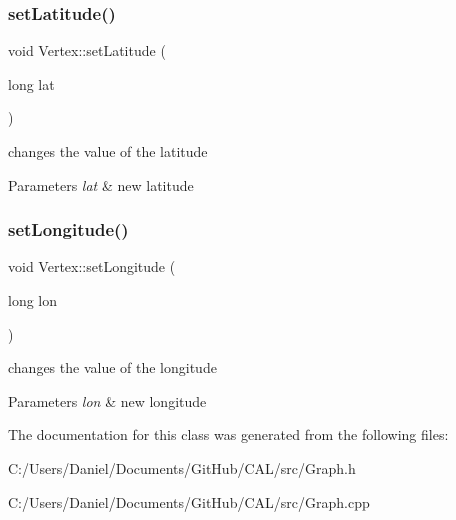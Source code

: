 \subsubsection{\texorpdfstring{set\+Latitude()}{setLatitude()}}
{\footnotesize\ttfamily void Vertex\+::set\+Latitude (\begin{DoxyParamCaption}\item[{long}]{lat }\end{DoxyParamCaption})}



changes the value of the latitude 


\begin{DoxyParams}{Parameters}
{\em lat} & new latitude \\
\hline
\end{DoxyParams}
\hypertarget{class_vertex_a7d0a5b733d2989ff210731130d59ea01}{}\label{class_vertex_a7d0a5b733d2989ff210731130d59ea01} 
\subsubsection{\texorpdfstring{set\+Longitude()}{setLongitude()}}
{\footnotesize\ttfamily void Vertex\+::set\+Longitude (\begin{DoxyParamCaption}\item[{long}]{lon }\end{DoxyParamCaption})}



changes the value of the longitude 


\begin{DoxyParams}{Parameters}
{\em lon} & new longitude \\
\hline
\end{DoxyParams}


The documentation for this class was generated from the following files\+:\begin{DoxyCompactItemize}
\item 
C\+:/\+Users/\+Daniel/\+Documents/\+Git\+Hub/\+C\+A\+L/src/Graph.\+h\item 
C\+:/\+Users/\+Daniel/\+Documents/\+Git\+Hub/\+C\+A\+L/src/Graph.\+cpp\end{DoxyCompactItemize}

